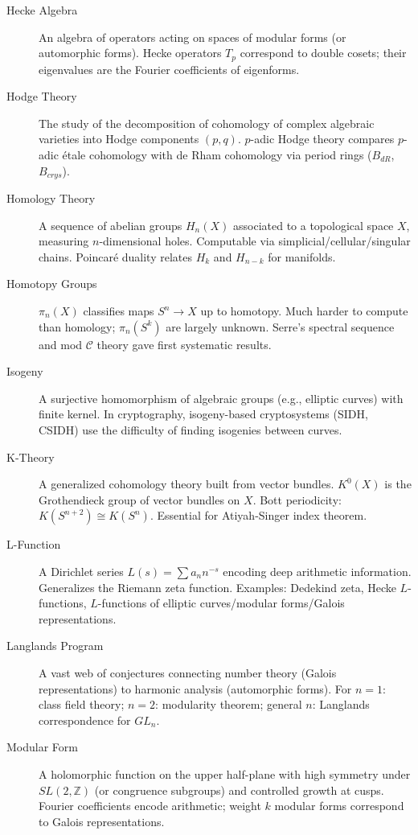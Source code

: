 \begin{description}
    \item[Hecke Algebra] An algebra of operators acting on spaces of modular forms (or automorphic forms). Hecke operators $T_p$ correspond to double cosets; their eigenvalues are the Fourier coefficients of eigenforms.

    \item[Hodge Theory] The study of the decomposition of cohomology of complex algebraic varieties into Hodge components $(p,q)$. $p$-adic Hodge theory compares $p$-adic étale cohomology with de Rham cohomology via period rings ($B_{dR}$, $B_{crys}$).

    \item[Homology Theory] A sequence of abelian groups $H_n(X)$ associated to a topological space $X$, measuring $n$-dimensional holes. Computable via simplicial/cellular/singular chains. Poincaré duality relates $H_k$ and $H_{n-k}$ for manifolds.

    \item[Homotopy Groups] $\pi_n(X)$ classifies maps $S^n \to X$ up to homotopy. Much harder to compute than homology; $\pi_n(S^k)$ are largely unknown. Serre's spectral sequence and mod $\mathcal{C}$ theory gave first systematic results.

    \item[Isogeny] A surjective homomorphism of algebraic groups (e.g., elliptic curves) with finite kernel. In cryptography, isogeny-based cryptosystems (SIDH, CSIDH) use the difficulty of finding isogenies between curves.

    \item[K-Theory] A generalized cohomology theory built from vector bundles. $K^0(X)$ is the Grothendieck group of vector bundles on $X$. Bott periodicity: $K(S^{n+2}) \cong K(S^n)$. Essential for Atiyah-Singer index theorem.

    \item[L-Function] A Dirichlet series $L(s) = \sum a_n n^{-s}$ encoding deep arithmetic information. Generalizes the Riemann zeta function. Examples: Dedekind zeta, Hecke $L$-functions, $L$-functions of elliptic curves/modular forms/Galois representations.

    \item[Langlands Program] A vast web of conjectures connecting number theory (Galois representations) to harmonic analysis (automorphic forms). For $n=1$: class field theory; $n=2$: modularity theorem; general $n$: Langlands correspondence for $GL_n$.

    \item[Modular Form] A holomorphic function on the upper half-plane with high symmetry under $SL(2,\mathbb{Z})$ (or congruence subgroups) and controlled growth at cusps. Fourier coefficients encode arithmetic; weight $k$ modular forms correspond to Galois representations.


\end{description}
